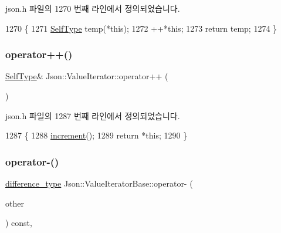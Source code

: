 json.\+h 파일의 1270 번째 라인에서 정의되었습니다.


\begin{DoxyCode}
1270                            \{
1271     \hyperlink{class_json_1_1_value_iterator_a23357670fdad61792670d86f62db7e16}{SelfType} temp(*\textcolor{keyword}{this});
1272     ++*\textcolor{keyword}{this};
1273     \textcolor{keywordflow}{return} temp;
1274   \}
\end{DoxyCode}
\mbox{\label{class_json_1_1_value_iterator_a92146c46f8249e2b2d12869e70cd4cee}} 
\subsubsection{\texorpdfstring{operator++()}{operator++()}\hspace{0.1cm}{\footnotesize\ttfamily [2/2]}}
{\footnotesize\ttfamily \hyperlink{class_json_1_1_value_iterator_base_a9d2a940d03ea06d20d972f41a89149ee}{Self\+Type}\& Json\+::\+Value\+Iterator\+::operator++ (\begin{DoxyParamCaption}{ }\end{DoxyParamCaption})\hspace{0.3cm}{\ttfamily [inline]}}



json.\+h 파일의 1287 번째 라인에서 정의되었습니다.


\begin{DoxyCode}
1287                          \{
1288     \hyperlink{class_json_1_1_value_iterator_base_afe58f9534e1fd2033419fd9fe244551e}{increment}();
1289     \textcolor{keywordflow}{return} *\textcolor{keyword}{this};
1290   \}
\end{DoxyCode}
\mbox{\label{class_json_1_1_value_iterator_base_a98e254263fca5f1fc8fcac7bcb0260bf}} 
\subsubsection{\texorpdfstring{operator-\/()}{operator-()}}
{\footnotesize\ttfamily \hyperlink{class_json_1_1_value_iterator_base_a4e44bf8cbd17ec8d6e2c185904a15ebd}{difference\+\_\+type} Json\+::\+Value\+Iterator\+Base\+::operator-\/ (\begin{DoxyParamCaption}\item[{const \hyperlink{class_json_1_1_value_iterator_base_a9d2a940d03ea06d20d972f41a89149ee}{Self\+Type} \&}]{other }\end{DoxyParamCaption}) const\hspace{0.3cm}{\ttfamily [inline]}, {\ttfamily [inherited]}}



